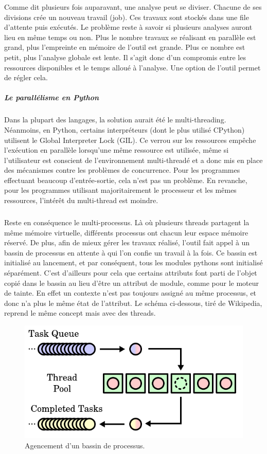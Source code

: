 Comme dit plusieurs fois auparavant, une analyse peut se diviser. Chacune de ses divisions crée un nouveau travail (job). Ces travaux sont stockés dans une file d'attente
puis exécutés. Le problème reste à savoir si plusieurs analyses auront lieu en même temps ou non. Plus le nombre travaux se réalisant en parallèle est grand, plus l'empreinte en mémoire de l'outil
est grande. Plus ce nombre est petit, plus l'analyse globale est lente. Il s'agit donc d'un compromis entre les ressources disponibles et le temps alloué à l'analyse. Une option de l'outil permet
de régler cela.
\subparagraph{Le parallélisme en Python}
Dans la plupart des langages, la solution aurait été le multi-threading. Néanmoins, en Python, certains interpréteurs (dont le plus utilisé CPython) utilisent le Global Interpreter Lock (GIL).
Ce verrou sur les ressources empêche l'exécution en parallèle lorsqu'une même ressource est utilisée, même si l'utilisateur est conscient de l'environnement multi-threadé et a donc mis en place
des mécanismes contre les problèmes de concurrence. Pour les programmes effectuant beaucoup d'entrée-sortie, cela n'est pas un problème. En revanche, pour les programmes utilisant majoritairement
le processeur et les mêmes ressources, l'intérêt du multi-thread est moindre.
\subparagraph{}
Reste en conséquence le multi-processus. Là où plusieurs threads partagent la même mémoire virtuelle, différents processus ont chacun leur espace mémoire réservé. De plus,
afin de mieux gérer les travaux réalisé, l'outil fait appel à un bassin de processus en attente à qui l'on confie un travail à la fois. Ce bassin est initialisé au lancement,
et par conséquent, tous les modules pythons sont initialisé séparément. C'est d'ailleurs pour cela que certains attributs font parti de l'objet copié dans le bassin au lieu d'être
un attribut de module, comme pour le moteur de tainte. En effet un contexte n'est pas toujours assigné au même processus, et donc n'a plus le même état de l'attribut.
Le schéma ci-dessous, tiré de Wikipedia, reprend le même concept mais avec des threads.
\begin{figure}[h]
    \centering
    \includegraphics[scale=0.5]{threadpool.png}\newline
    \caption{Agencement d'un bassin de processus.}
\end{figure}

